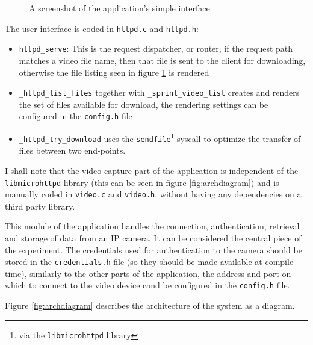 \documentclass[10pt,a4paper,twoside]{article}
\begin{document}
\begin{figure}[H]
  \centering
  \caption{A screenshot of the application's simple interface}
  \label{fig:interface}
\end{figure}

The user interface is coded in \texttt{httpd.c} and \texttt{httpd.h}:

\begin{itemize}
\item \texttt{httpd\_serve}: This is the request dispatcher, or router, if the request path matches a video file name,
then that file is sent to the client for downloading, otherwise the file listing seen in figure \ref{fig:interface} is rendered
\item \texttt{\_httpd\_list\_files} together with \texttt{\_sprint\_video\_list} creates and renders
the set of files available for download, the rendering settings can be configured in the \texttt{config.h} file
\item \texttt{\_httpd\_try\_download} uses the \texttt{sendfile}\footnote{via the \texttt{libmicrohttpd} library}
syscall to optimize the transfer of files between two end-points.
\end{itemize}

I shall note that the video capture part of the application is independent of the \texttt{libmicrohttpd}
library (this can be seen in figure \ref{fig:archdiagram}) and is manually coded in
\texttt{video.c} and \texttt{video.h},
without having any dependencies on a third party library.

This module of the application handles the connection, authentication, retrieval and storage of data
from an IP camera.
 It can be considered the central piece of the experiment.
 The credentials used for authentication to the camera should be stored in the \texttt{credentials.h}
 file (so they should be made available at compile time), similarly to the other parts of the application,
 the address and port on which to connect to the video device cand be configured in the \texttt{config.h} file.

Figure \ref{fig:archdiagram} describes the architecture of the system as a diagram.
\end{document}

